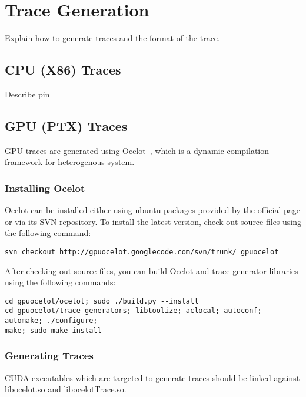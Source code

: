 
\clearpage
\section{Trace Generation}

Explain how to generate traces and the format of the trace.

\subsection{CPU (X86) Traces}

Describe pin

\subsection{GPU (PTX) Traces}

GPU traces are generated using Ocelot~\cite{}, which is a dynamic compilation
framework for heterogenous system. 

\subsubsection{Installing Ocelot}

Ocelot can be installed either using ubuntu packages provided by the official
page or via its SVN repository. To install the latest version, check out 
source files using the following command:

\smallskip
\begin{lstlisting}
svn checkout http://gpuocelot.googlecode.com/svn/trunk/ gpuocelot
\end{lstlisting}
\smallskip

After checking out source files, you can build Ocelot and trace generator libraries using the following commands:

\smallskip
\begin{lstlisting}
cd gpuocelot/ocelot; sudo ./build.py --install
cd gpuocelot/trace-generators; libtoolize; aclocal; autoconf; automake; ./configure; 
make; sudo make install
\end{lstlisting}
\smallskip


\subsubsection{Generating Traces}

CUDA executables which are targeted to generate traces should be linked against
libocelot.so and libocelotTrace.so.

